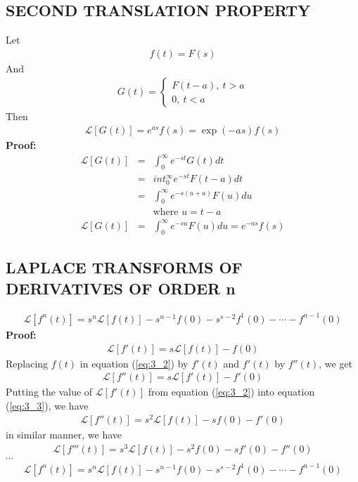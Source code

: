 \documentclass[11pt]{report}
\newcommand{\bt}[1]{\textbf{#1}}
\newcommand{\sps}{\\[0.2cm]}
\newcommand{\refn}[1]{(\ref{#1})}
\newcommand{\refx}[1]{\refn{eq:#1}}
\newcommand{\sprime}{'}
\newcommand{\dprime}{''}
\newcommand{\tprime}{'''}
\newcommand{\Laplace}{\mathcal{L}}
\newcommand{\ft}{f(t)}
\newcommand{\Fs}{F(s)}
\newcommand{\sbracket}[1]{\left[#1\right]}
\newcommand{\LFt}{\Laplace \sbracket{\ft}}
\newcommand{\LFn}[1]{\Laplace \sbracket{#1}}
\begin{document}
	\subsection{SECOND TRANSLATION PROPERTY}
	Let
	\begin{eqnarray*}
		\ft = \Fs
	\end{eqnarray*}
	And
	\begin{eqnarray*}
		G(t) = \left\{
				\begin{array}{l}
					F(t-a),~ t > a\\
					0,~ t < a
				\end{array}
		\right.
	\end{eqnarray*}
	Then
	\begin{eqnarray*}
		\LFn{G(t)} = e^{as}f(s) = \exp(-as)f(s)
	\end{eqnarray*}
	\bt{Proof:}\\
	\begin{eqnarray*}
		\LFn{G(t)} &=& \int_0^\infty e^{-st}G(t)dt\sps
		&=& int_0^\infty e^{-st}F(t-a)dt\sps
		&=& \int_0^\infty e^{-s(u+a)}F(u)du\sps
		&& \text{where } u = t-a\sps
		\LFn{G(t)} &=& \int_0^\infty e^{-su}F(u)du = e^{-as}f(s)
	\end{eqnarray*}
	
	\subsection{LAPLACE TRANSFORMS OF DERIVATIVES OF ORDER n}
	\begin{eqnarray*}
		\LFn{f^n(t)} = s^n\LFt - s^{n-1}f(0) - s^{s-2}f^1(0) - \cdots - f^{n-1}(0)
	\end{eqnarray*}
	\bt{Proof:}
	\begin{eqnarray}
		\LFn{f\sprime(t)} = s\LFt - f(0)\label{eq:3_2}
	\end{eqnarray}
	Replacing $f(t)$ in equation \refx{3_2} by $f\sprime(t)$ and $f\sprime(t)$ by $f\dprime(t)$, we get
	\begin{eqnarray}
		\LFn{f\dprime(t)} = s\LFn{f\sprime(t)} - f\sprime(0)\label{eq:3_3}
	\end{eqnarray}
	Putting the value of $\LFn{f\sprime(t)}$ from equation \refx{3_2} into equation \refx{3_3}, we have
	\begin{eqnarray}
			\LFn{f\dprime(t)} = s^2\LFt - sf(0) - f\sprime(0)
	\end{eqnarray}
	in similar manner, we have
	\begin{eqnarray}
		\LFn{f\tprime(t)} = s^3\LFt - s^2f(0) - sf\sprime(0) - f\dprime(0)\label{eq:3_5}
	\end{eqnarray}
	$\cdots$
	\begin{eqnarray}
		\LFn{f^n(t)} = s^n\LFt - s^{n-1}f(0) - s^{s-2}f^1(0) - \cdots - f^{n-1}(0)
	\end{eqnarray}
\end{document}
